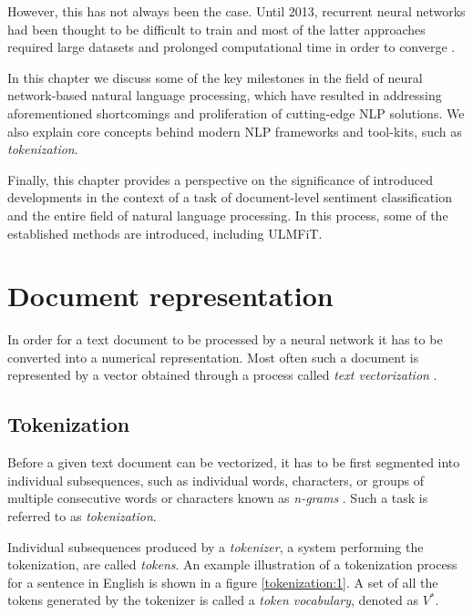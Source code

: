 However, this has not always been the case. Until 2013, recurrent neural networks had been thought to be difficult to train \cite{ruder:neuralnlp,sutskever:rnntraining} and most of the latter approaches required large datasets and prolonged computational time in order to converge \cite{ulmfit}. 

In this chapter we discuss some of the key milestones in the field of neural network-based natural language processing, which have resulted in addressing aforementioned shortcomings and proliferation of cutting-edge NLP solutions. We also explain core concepts behind modern NLP frameworks and tool-kits, such as \emph{tokenization}.

Finally, this chapter provides a perspective on the significance of introduced developments in the context of a task of document-level sentiment classification and the entire field of natural language processing. In this process, some of the established methods are introduced, including ULMFiT.


\section{Document representation}
\label{document:representation}

In order for a text document to be processed by a neural network it has to be converted into a numerical representation. Most often such a document is represented by a vector obtained through a process called \emph{text vectorization} \cite{chollet}.

\subsection{Tokenization}

Before a given text document can be vectorized, it has to be first segmented into individual subsequences, such as individual words, characters, or groups of multiple consecutive words or characters known as \emph{n-grams} \cite{chollet}. Such a task is referred to as \emph{tokenization}. 

Individual subsequences produced by a \emph{tokenizer}, a system performing the tokenization, are called \emph{tokens}. An example illustration of a tokenization process for a sentence in English is shown in a figure \ref{tokenization:1}. A set of all the tokens generated by the tokenizer is called a \emph{token vocabulary}, denoted as $V^*$.

